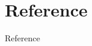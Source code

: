 \documentclass[aspectratio=169]{beamer}
\begin{document}

    \section{Reference}
    \begin{frame}{Reference}
        \nocite{*}
        \printbibliography
    \end{frame}

    \maketitle
\end{document}
